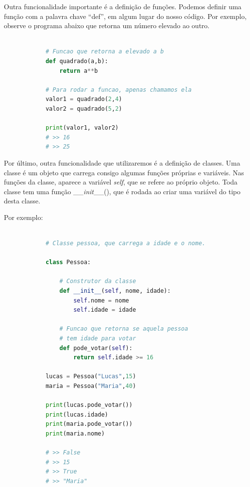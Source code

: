         Outra funcionalidade importante é a definição de funções. Podemos definir uma função com a palavra chave ``def'', em algum lugar do nosso código. Por exemplo, observe o programa abaixo que retorna um número elevado ao outro.

        \begin{lstlisting}[language=Python]
            
            # Funcao que retorna a elevado a b
            def quadrado(a,b):
                return a**b

            # Para rodar a funcao, apenas chamamos ela
            valor1 = quadrado(2,4)
            valor2 = quadrado(5,2)

            print(valor1, valor2)
            # >> 16
            # >> 25

        \end{lstlisting}

        Por último, outra funcionalidade que utilizaremos é a definição de classes. Uma classe é um objeto que carrega consigo algumas funções próprias e variáveis. Nas funções da classe, aparece a variável \textit{self}, que se refere ao próprio objeto. Toda classe tem uma função \_\_\textit{init}\_\_(), que é rodada ao criar uma variável do tipo desta classe.
        
        Por exemplo:

        \begin{lstlisting}[language=Python]
            
            # Classe pessoa, que carrega a idade e o nome.
            
            class Pessoa:

                # Construtor da classe
                def __init__(self, nome, idade):
                    self.nome = nome
                    self.idade = idade

                # Funcao que retorna se aquela pessoa 
                # tem idade para votar
                def pode_votar(self):
                    return self.idade >= 16

            lucas = Pessoa("Lucas",15)
            maria = Pessoa("Maria",40)
            
            print(lucas.pode_votar())
            print(lucas.idade)
            print(maria.pode_votar())
            print(maria.nome)

            # >> False
            # >> 15
            # >> True
            # >> "Maria"

        \end{lstlisting}

